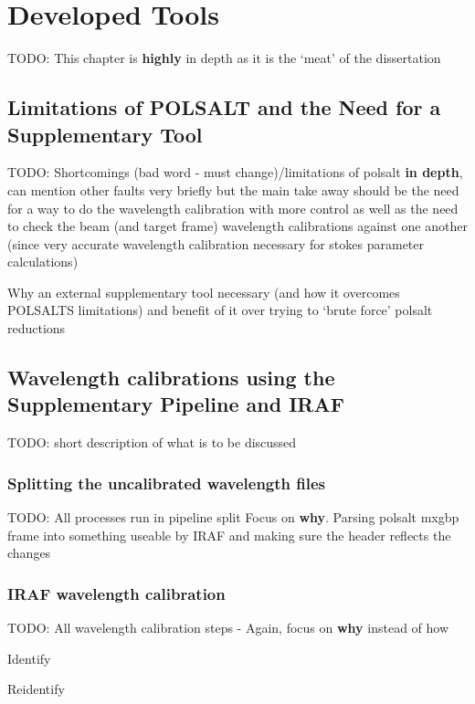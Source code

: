 \chapter{Developed Tools}

TODO: This chapter is \textbf{highly} in depth as it is the `meat' of the dissertation

\section{Limitations of POLSALT and the Need for a Supplementary Tool} %

TODO: Shortcomings (bad word - must change)/limitations of polsalt \textbf{in depth}, can mention other faults very briefly but the main take away should be the need for a way to do the wavelength calibration with more control as well as the need to check the beam (and target frame) wavelength calibrations against one another (since very accurate wavelength calibration necessary for stokes parameter calculations)

Why an external supplementary tool necessary (and how it overcomes POLSALTS limitations) and benefit of it over trying to `brute force' polsalt reductions

\section{Wavelength calibrations using the Supplementary Pipeline and IRAF}

TODO: short description of what is to be discussed

\subsection{Splitting the uncalibrated wavelength files}

TODO: All processes run in pipeline split
Focus on \textbf{why}. Parsing polsalt mxgbp frame into something useable by IRAF and making sure the header reflects the changes

\subsection{IRAF wavelength calibration}

TODO: All wavelength calibration steps - Again, focus on \textbf{why} instead of how

Identify

Reidentify


